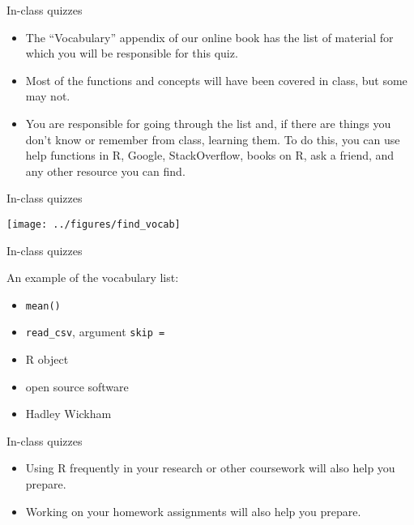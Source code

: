\documentclass[
  10pt,
  ignorenonframetext,
]{beamer}
\providecommand{\tightlist}{%
  \setlength{\itemsep}{0pt}\setlength{\parskip}{0pt}}
\begin{document}
\begin{frame}{In-class quizzes}
\protect\hypertarget{in-class-quizzes-4}{}

\begin{itemize}
\tightlist
\item
  The ``Vocabulary'' appendix of our online book has the list of
  material for which you will be responsible for this quiz.
\item
  Most of the functions and concepts will have been covered in class,
  but some may not.
\item
  You are responsible for going through the list and, if there are
  things you don't know or remember from class, learning them. To do
  this, you can use help functions in R, Google, StackOverflow, books on
  R, ask a friend, and any other resource you can find.
\end{itemize}

\end{frame}

\begin{frame}{In-class quizzes}
\protect\hypertarget{in-class-quizzes-5}{}

\begin{center}\texttt{[image: ../figures/find\_vocab]} \end{center}

\end{frame}

\begin{frame}[fragile]{In-class quizzes}
\protect\hypertarget{in-class-quizzes-6}{}

An example of the vocabulary list:

\begin{itemize}
\tightlist
\item
  \texttt{mean()}
\item
  \texttt{read\_csv}, argument \texttt{skip\ =}
\item
  R object
\item
  open source software
\item
  Hadley Wickham
\end{itemize}

\end{frame}

\begin{frame}{In-class quizzes}
\protect\hypertarget{in-class-quizzes-7}{}

\begin{itemize}
\tightlist
\item
  Using R frequently in your research or other coursework will also help
  you prepare.
\item
  Working on your homework assignments will also help you prepare.
\end{itemize}

\end{frame}
\end{document}
